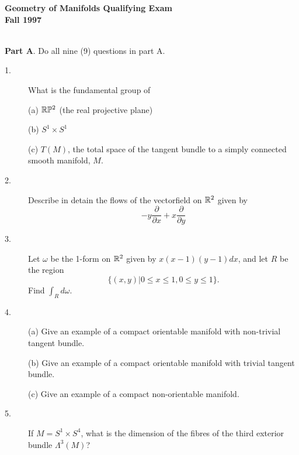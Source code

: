 \documentclass{article}
\begin{document}






\begin{center}\begin{LARGE}
{\bf Geometry of Manifolds Qualifying Exam}\\ 
{\bf Fall 1997}\\ \end{LARGE}
\end{center}
\vspace{0.1in}
\noindent\hrulefill\\

{\bf Part A}. Do all nine (9) questions in part A.

\begin{description}

\item[1.]
What is the fundamental group of

\item[\quad] (a)
$\Bbb R \Bbb P^2$ (the real projective plane)

\item[\quad] (b)
$S^1 \times S^1$

\item[\quad] (c)
$T(M)$, the total space of the tangent bundle to a simply connected smooth
manifold, $M$.

\item[2.]
Describe in detain the flows of the vectorfield on $\Bbb R^2$ given by
$$-y \frac{\partial}{\partial x} + x \frac{\partial}{\partial y}$$

\item[3.]
Let $\omega$ be the 1-form on $\Bbb R^2$ given by $x(x-1)(y-1)dx$,
and let $R$ be the region
$$\{(x,y) | 0 \leq x \leq 1, 0 \leq y \leq 1\}.$$
Find $\int_R d\omega$.

\item[4.] (a)
Give an example of a compact orientable manifold with non-trivial
tangent bundle.

\item[\quad] (b)
Give an example of a compact orientable manifold with trivial tangent
bundle.

\item[\quad] (c)
Give an example of a compact non-orientable manifold.

\item[5.]
If $M= S^1 \times S^4$, what is the dimension of the fibres of the third
exterior bundle $\Lambda^3(M)$?


\end{description}
\end{document}
